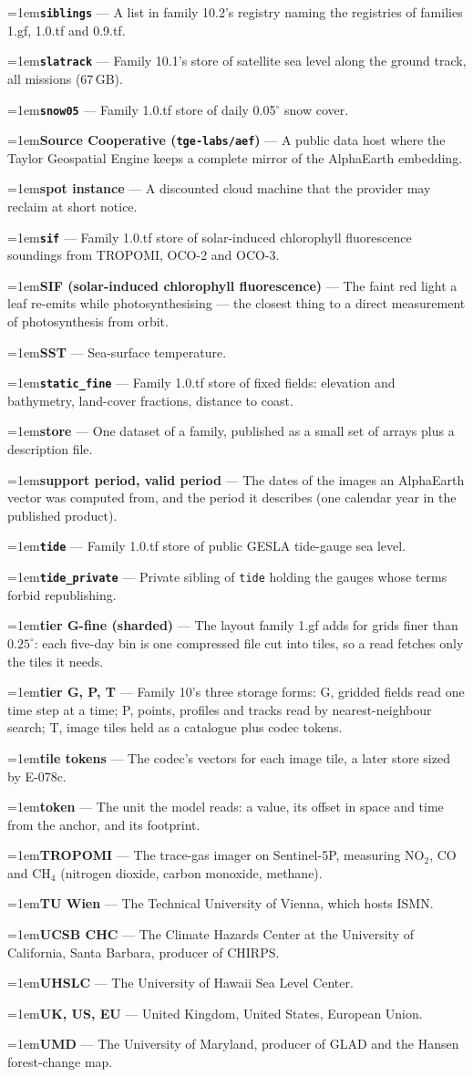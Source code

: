 \documentclass[10pt]{article}
\newcommand{\code}[1]{\texttt{#1}}
\newcommand{\gl}[2]{\par\hangindent=1em\hangafter=1\textbf{#1} --- #2\par}
\begin{document}
\gl{\code{siblings}}{A list in family 10.2's registry naming the registries of families 1.gf, 1.0.tf and 0.9.tf.}
\gl{\code{slatrack}}{Family 10.1's store of satellite sea level along the ground track, all missions (67\,GB).}
\gl{\code{snow05}}{Family 1.0.tf store of daily 0.05$^\circ$ snow cover.}
\gl{Source Cooperative (\code{tge-labs/aef})}{A public data host where the Taylor Geospatial Engine keeps a complete mirror of the AlphaEarth embedding.}
\gl{spot instance}{A discounted cloud machine that the provider may reclaim at short notice.}
\gl{\code{sif}}{Family 1.0.tf store of solar-induced chlorophyll fluorescence soundings from TROPOMI, OCO-2 and OCO-3.}
\gl{SIF (solar-induced chlorophyll fluorescence)}{The faint red light a leaf re-emits while photosynthesising --- the closest thing to a direct measurement of photosynthesis from orbit.}
\gl{SST}{Sea-surface temperature.}
\gl{\code{static\_fine}}{Family 1.0.tf store of fixed fields: elevation and bathymetry, land-cover fractions, distance to coast.}
\gl{store}{One dataset of a family, published as a small set of arrays plus a description file.}
\gl{support period, valid period}{The dates of the images an AlphaEarth vector was computed from, and the period it describes (one calendar year in the published product).}
\gl{\code{tide}}{Family 1.0.tf store of public GESLA tide-gauge sea level.}
\gl{\code{tide\_private}}{Private sibling of \code{tide} holding the gauges whose terms forbid republishing.}
\gl{tier G-fine (sharded)}{The layout family 1.gf adds for grids finer than $0.25^\circ$: each five-day bin is one compressed file cut into tiles, so a read fetches only the tiles it needs.}
\gl{tier G, P, T}{Family 10's three storage forms: G, gridded fields read one time step at a time; P, points, profiles and tracks read by nearest-neighbour search; T, image tiles held as a catalogue plus codec tokens.}
\gl{tile tokens}{The codec's vectors for each image tile, a later store sized by E-078c.}
\gl{token}{The unit the model reads: a value, its offset in space and time from the anchor, and its footprint.}
\gl{TROPOMI}{The trace-gas imager on Sentinel-5P, measuring NO$_2$, CO and CH$_4$ (nitrogen dioxide, carbon monoxide, methane).}
\gl{TU Wien}{The Technical University of Vienna, which hosts ISMN.}
\gl{UCSB CHC}{The Climate Hazards Center at the University of California, Santa Barbara, producer of CHIRPS.}
\gl{UHSLC}{The University of Hawaii Sea Level Center.}
\gl{UK, US, EU}{United Kingdom, United States, European Union.}
\gl{UMD}{The University of Maryland, producer of GLAD and the Hansen forest-change map.}
\end{document}
